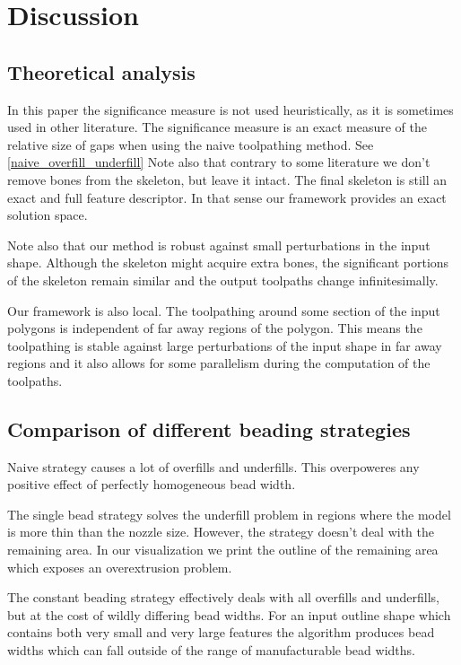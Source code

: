 \section{Discussion}

\subsection{Theoretical analysis}
In this paper the significance measure is not used heuristically, as it is sometimes used in other literature.
The significance measure is an exact measure of the relative size of gaps when using the naive toolpathing method.
See \cref{naive_overfill_underfill}
Note also that contrary to some literature we don't remove bones from the skeleton, but leave it intact.
The final skeleton is still an exact and full feature descriptor.
In that sense our framework provides an exact solution space.

Note also that our method is robust against small perturbations in the input shape.
Although the skeleton might acquire extra bones, the significant portions of the skeleton remain similar and the output toolpaths change infinitesimally.

Our framework is also local.
The toolpathing around some section of the input polygons is independent of far away regions of the polygon.
This means the toolpathing is stable against large perturbations of the input shape in far away regions
and it also allows for some parallelism during the computation of the toolpaths.


\subsection{Comparison of different beading strategies}

Naive strategy causes a lot of overfills and underfills.
This overpoweres any positive effect of perfectly homogeneous bead width.

The single bead strategy solves the underfill problem in regions where the model is more thin than the nozzle size.
However, the strategy doesn't deal with the remaining area.
In our visualization we print the outline of the remaining area which exposes an overextrusion problem.

The constant beading strategy effectively deals with all overfills and underfills, but at the cost of wildly differing bead widths.
For an input outline shape which contains both very small and very large features the algorithm produces bead widths which can fall outside of the range of manufacturable bead widths.

